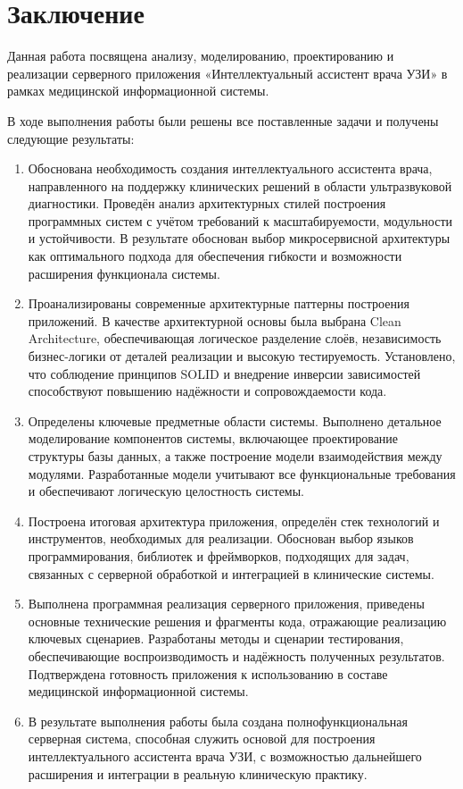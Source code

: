 \chapter*{Заключение}

Данная работа посвящена анализу, моделированию, проектированию и реализации серверного приложения «Интеллектуальный ассистент врача УЗИ» в рамках медицинской информационной системы.


В ходе выполнения работы были решены все поставленные задачи и получены следующие результаты:
\begin{enumerate}
    \item Обоснована необходимость создания интеллектуального ассистента врача, направленного на поддержку клинических решений в области ультразвуковой диагностики. Проведён анализ архитектурных стилей построения программных систем с учётом требований к масштабируемости, модульности и устойчивости. В результате обоснован выбор микросервисной архитектуры как оптимального подхода для обеспечения гибкости и возможности расширения функционала системы.
    \item Проанализированы современные архитектурные паттерны построения приложений. В качестве архитектурной основы была выбрана Clean Architecture, обеспечивающая логическое разделение слоёв, независимость бизнес-логики от деталей реализации и высокую тестируемость. Установлено, что соблюдение принципов SOLID и внедрение инверсии зависимостей способствуют повышению надёжности и сопровождаемости кода.
    \item Определены ключевые предметные области системы. Выполнено детальное моделирование компонентов системы, включающее проектирование структуры базы данных, а также построение модели взаимодействия между модулями. Разработанные модели учитывают все функциональные требования и обеспечивают логическую целостность системы.
    \item Построена итоговая архитектура приложения, определён стек технологий и инструментов, необходимых для реализации. Обоснован выбор языков программирования, библиотек и фреймворков, подходящих для задач, связанных с серверной обработкой и интеграцией в клинические системы.
    \item Выполнена программная реализация серверного приложения, приведены основные технические решения и фрагменты кода, отражающие реализацию ключевых сценариев. Разработаны методы и сценарии тестирования, обеспечивающие воспроизводимость и надёжность полученных результатов. Подтверждена готовность приложения к использованию в составе медицинской информационной системы.
    \item В результате выполнения работы была создана полнофункциональная серверная система, способная служить основой для построения интеллектуального ассистента врача УЗИ, с возможностью дальнейшего расширения и интеграции в реальную клиническую практику.
\end{enumerate}

